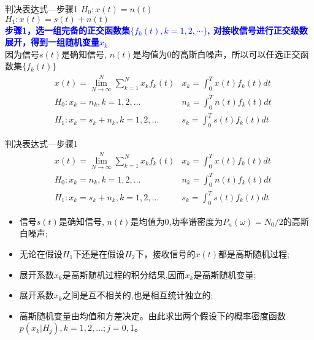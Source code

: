 \begin{frame}{判决表达式---步骤1}
$H_0: x(t)=n(t)$\\
$H_1: x(t)=s(t)+n(t)$\\
\textbf{\textcolor{blue}{步骤1，选一组完备的正交函数集$\{f_k(t),k=1,2,\cdots \}$, 对接收信号进行正交级数展开，得到一组随机变量$x_k$}}\\
因为信号$s(t)$是确知信号, $n(t)$是均值为0的高斯白噪声，所以可以任选正交函数集$\{f_k(t)\}$
\begin{align*}
&x(t)=\lim\limits_{N\to\infty}^N\sum\limits_{k=1}^Nx_kf_k(t)&x_k=\int_{0}^{T}x(t)f_k(t)dt \\
&H_0: x_k=n_k,k=1,2,\dots &n_k=\int_{0}^{T}n(t)f_k(t)dt\\
&H_1: x_k=s_k+n_k,k=1,2,\dots &s_k=\int_{0}^{T}s(t)f_k(t)dt
\end{align*}
\end{frame}

\begin{frame}[shrink]{判决表达式---步骤1}
\begin{align*}
&x(t)=\lim\limits_{N\to\infty}^N\sum\limits_{k=1}^Nx_kf_k(t)&x_k=\int_{0}^{T}x(t)f_k(t)dt \\
&H_0: x_k=n_k,k=1,2,\dots &n_k=\int_{0}^{T}n(t)f_k(t)dt\\
&H_1: x_k=s_k+n_k,k=1,2,\dots &s_k=\int_{0}^{T}s(t)f_k(t)dt
\end{align*}
\begin{itemize}
	\item 信号$s(t)$是确知信号, $n(t)$是均值为0,功率谱密度为$P_n(\omega)=N_0/2$的高斯白噪声;
	\item 无论在假设$H_1$下还是在假设$H_2$下，接收信号的$x(t)$都是高斯随机过程;
	\item 展开系数$x_k$是高斯随机过程的积分结果,因而$x_k$是高斯随机变量;
	\item 展开系数$x_k$之间是互不相关的,也是相互统计独立的;
	\item 高斯随机变量由均值和方差决定。由此求出两个假设下的概率密度函数$p(x_k|H_j),k=1,2,\dots;j=0,1$。
\end{itemize}
\end{frame}

